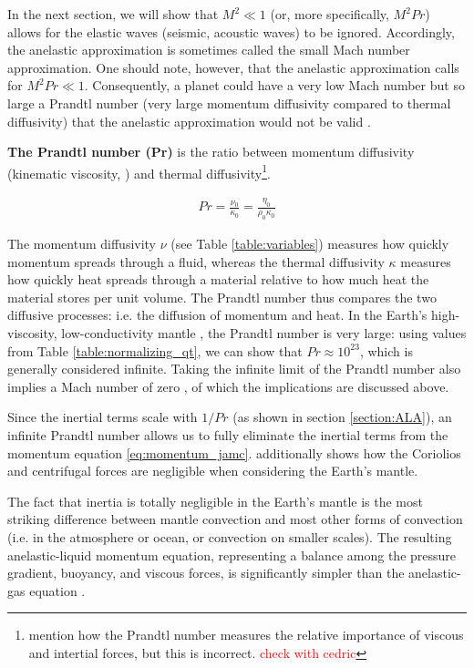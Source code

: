 \documentclass[a4paper]{article}
\begin{document}
In the next section, we will show that  $M^2 \ll 1$ (or, more specifically, $M^2Pr$) allows for the elastic waves (seismic, acoustic waves) to be ignored. Accordingly, the 
anelastic approximation is sometimes called the small Mach number approximation.  
One should note, however, that the anelastic approximation calls for $M^2Pr \ll 1$. Consequently, a planet could have a very low Mach number but so large a Prandtl number (very large momentum diffusivity compared 
to thermal diffusivity) that the anelastic approximation would not be valid \autocite{rica07}.

\textbf{The Prandtl number (Pr)} is the ratio between momentum diffusivity (kinematic viscosity, \autocite{jamc80}) and thermal diffusivity\footnote{\textcite{jamc80} mention 
how the Prandtl number measures the relative importance of viscous and intertial forces, but this is incorrect. \textcolor{red}{check with cedric}}. 

\begin{align*}
    \mathit{Pr} = \frac{\nu_0}{\kappa_0} = \frac{\eta_0}{\rho_0\kappa_0}
\end{align*}

The momentum diffusivity $\nu$ (see Table \ref{table:variables}) measures how quickly momentum spreads through a fluid, whereas the thermal diffusivity $\kappa$ measures how quickly 
heat spreads through a material relative to how much heat the material stores per unit volume. The Prandtl number thus compares the 
two diffusive processes: i.e. the diffusion of momentum and heat. In the Earth's high-viscosity, low-conductivity mantle \autocite{glat88}, the Prandtl number is very large: using 
values from Table \ref{table:normalizing_qt}, we can show that $\mathit{Pr} \approx 10^{23}$, which is generally considered infinite. Taking the infinite limit of the Prandtl number also implies a 
Mach number of zero \autocite{cudu19}, of which the implications are discussed above. 

Since the inertial terms scale with $1/\mathit{Pr}$ (as shown in section \ref{section:ALA}), an infinite Prandtl number allows us to fully 
eliminate the inertial terms from the momentum equation \eqref{eq:momentum_jamc}. \textcite{glat88} additionally shows how the Coriolios and centrifugal forces are negligible when considering the 
Earth's mantle. 

The fact that inertia is totally negligible in the Earth's mantle is the most striking difference between mantle 
convection and most other forms of convection (i.e. in the atmosphere or ocean, or convection on smaller scales). The resulting anelastic-liquid momentum equation, representing a balance among the
pressure gradient, buoyancy, and viscous forces, is significantly simpler 
than the anelastic-gas equation \autocite{jamc80,rica07,glat88}. 
\end{document}
